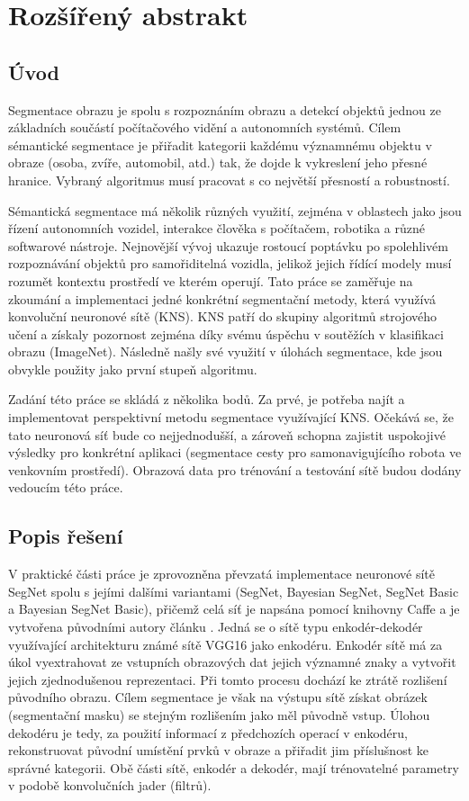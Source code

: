 \chapter*{Rozšířený abstrakt}

\section*{Úvod}

Segmentace obrazu je spolu s rozpoznáním obrazu a detekcí objektů jednou ze základních součástí počítačového vidění a autonomních systémů. Cílem sémantické segmentace je přiřadit kategorii každému významnému objektu v obraze (osoba, zvíře, automobil, atd.) tak, že dojde k vykreslení jeho přesné hranice. Vybraný algoritmus musí pracovat s co největší přesností a robustností.

Sémantická segmentace má několik různých využití, zejména v oblastech jako jsou řízení autonomních vozidel, interakce člověka s počítačem, robotika a různé softwarové nástroje. Nejnovější vývoj ukazuje rostoucí poptávku po spolehlivém rozpoznávání objektů pro samořiditelná vozidla, jelikož jejich řídící modely musí rozumět kontextu prostředí ve kterém operují. Tato práce se zaměřuje na zkoumání a implementaci jedné konkrétní segmentační metody, která využívá konvoluční neuronové sítě (KNS). KNS patří do skupiny algoritmů strojového učení a získaly pozornost zejména díky svému úspěchu v soutěžích v klasifikaci obrazu (ImageNet). Následně našly své využití v úlohách segmentace, kde jsou obvykle použity jako první stupeň algoritmu. 

Zadání této práce se skládá z několika bodů. Za prvé, je potřeba najít a implementovat perspektivní metodu segmentace využívající KNS. Očekává se, že tato neuronová síť bude co nejjednodušší, a zároveň schopna zajistit uspokojivé výsledky pro konkrétní aplikaci (segmentace cesty pro samonavigujícího robota ve venkovním prostředí). Obrazová data pro trénování a testování sítě budou dodány vedoucím této práce. 

\section*{Popis řešení}

V praktické části práce je zprovozněna převzatá implementace neuronové sítě SegNet spolu s jejími dalšími variantami (SegNet, Bayesian SegNet, SegNet Basic a Bayesian SegNet Basic), přičemž celá síť je napsána pomocí knihovny Caffe a je vytvořena původními autory článku \cite{segnet}. Jedná se o sítě typu enkodér-dekodér využívající architekturu známé sítě VGG16 jako enkodéru. Enkodér sítě má za úkol vyextrahovat ze vstupních obrazových dat jejich významné znaky a vytvořit jejich zjednodušenou reprezentaci. Při tomto procesu dochází ke ztrátě rozlišení původního obrazu. Cílem segmentace je však na výstupu sítě získat obrázek (segmentační masku) se stejným rozlišením jako měl původně vstup. Úlohou dekodéru je tedy, za použití informací z předchozích operací v enkodéru, rekonstruovat původní umístění prvků v obraze a přiřadit jim příslušnost ke správné kategorii. Obě části sítě, enkodér a dekodér, mají trénovatelné parametry v podobě konvolučních jader (filtrů). 

